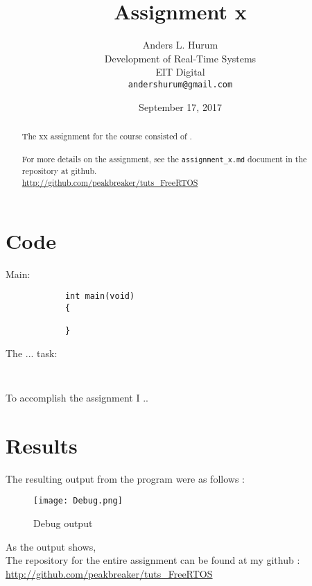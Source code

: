 \documentclass[12pt,fleqn,leqno,letterpaper]{article}
\title{Assignment x}
\author{Anders L. Hurum\\
    \small{Development of Real-Time Systems}\\
    \small{EIT Digital}\\
    \small{\texttt{andershurum@gmail.com}}
}
\date{September 17, 2017}
\begin{document}
    \maketitle

    \begin{abstract}
        
        The xx assignment for the course consisted of . \\ \\
        For more details on the assignment, see the \texttt{assignment\_x.md} document 
        in the repository at github. \\
        
        \url{http://github.com/peakbreaker/tuts\_FreeRTOS}

    \end{abstract}

    \newpage

    \section*{Code}

        Main:

        \begin{verbatim}
            int main(void)
            {
                
            }
        \end{verbatim}

        The ... task:

        \begin{verbatim}
            
        \end{verbatim}

        To accomplish the assignment I ..
    \newpage
    \section*{Results}

        The resulting output from the program were as follows : \\

        \begin{figure}[h]
            \centering
            \texttt{[image: Debug.png]}
            \caption{Debug output}
            \label{figure:debug}
        \end{figure}

        As the output shows, \\
        
        The repository for the entire assignment can be found at my github : \\
        
        \url{http://github.com/peakbreaker/tuts\_FreeRTOS}

    
\end{document}
